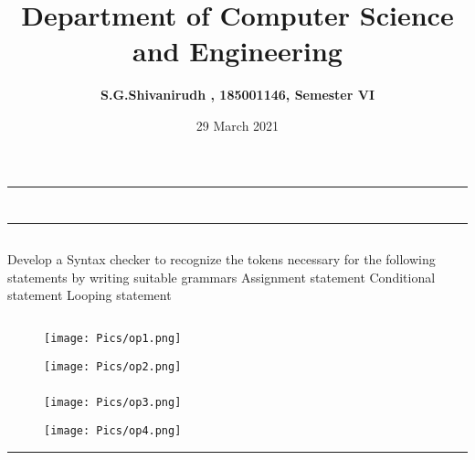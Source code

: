 \documentclass[12pt,letterpaper]{article}
\title{\textbf{Department of Computer Science and Engineering}}
\author{\textbf{S.G.Shivanirudh , 185001146, Semester VI }}
\date{29 March 2021}
\begin{document}
\maketitle
\hrule
\section*{}
\hrule 
\bigskip\bigskip

\subsection*{}

\subsection*{}
\begin{flushleft}
    Develop a Syntax checker to recognize the tokens necessary for the following statements by writing suitable grammars
    Assignment statement
    Conditional statement
    Looping statement
\end{flushleft}

\subsection*{}
\subsubsection*{}
\begin{flushleft}

\end{flushleft}
\subsubsection*{}
\begin{flushleft}

\end{flushleft}

\newpage
\subsection*{}

\subsubsection*{}
\begin{figure}[h]
    \centering
    \texttt{[image: Pics/op1.png]}
\end{figure}
\begin{figure}[h]
    \centering
    \texttt{[image: Pics/op2.png]}
\end{figure}

\newpage
\subsubsection*{}
\begin{figure}[h]
    \centering
    \texttt{[image: Pics/op3.png]}
\end{figure}
\begin{figure}[h]
    \centering
    \texttt{[image: Pics/op4.png]}
\end{figure}
\hrule
\end{document}
